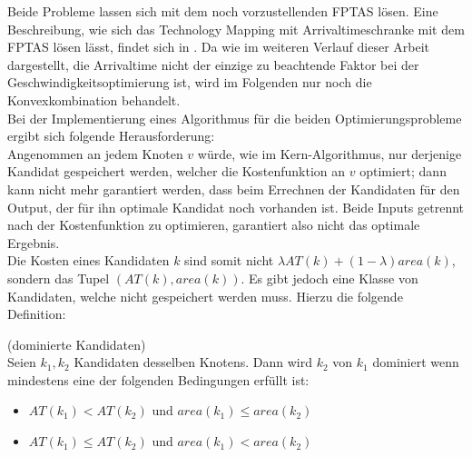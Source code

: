 \documentclass[11pt, a4paper, german]{article}
\newcommand{\TM}{Technology  Mapping }
\begin{document}
Beide Probleme lassen sich mit dem noch vorzustellenden FPTAS lösen. Eine Beschreibung, wie sich das \TM mit Arrivaltimeschranke mit dem FPTAS lösen lässt, findet sich in \cite{Elbert}.  Da wie im weiteren Verlauf dieser Arbeit dargestellt, die Arrivaltime nicht der einzige zu beachtende Faktor bei der Geschwindigkeitsoptimierung ist, wird im Folgenden nur noch die Konvexkombination behandelt.\\


Bei der Implementierung eines Algorithmus für die beiden Optimierungsprobleme ergibt sich folgende Herausforderung:\\

Angenommen an jedem Knoten $v$ würde, wie im Kern-Algorithmus, nur derjenige Kandidat gespeichert werden, welcher die Kostenfunktion an $v$ optimiert; dann kann nicht mehr garantiert werden, dass beim Errechnen der Kandidaten für den Output, der für ihn optimale Kandidat noch vorhanden ist. Beide Inputs getrennt nach der Kostenfunktion zu optimieren, garantiert also nicht das optimale Ergebnis.\\

Die Kosten eines Kandidaten $k$ sind somit nicht $\lambda AT(k) +(1-\lambda )area(k)$,  sondern das Tupel $(AT(k), area(k))$.
Es gibt jedoch eine Klasse von Kandidaten, welche nicht gespeichert werden muss. Hierzu die folgende Definition:

\begin{definition}{(dominierte Kandidaten)}\\
	Seien $k_1, k_2$ Kandidaten desselben Knotens. Dann wird $k_2$ von $k_1$ dominiert wenn mindestens eine der folgenden Bedingungen erfüllt ist:
	\begin{itemize}
	\item $AT(k_1) < AT(k_2) \text { und  }area(k_1) \leq area(k_2)$
	\item $	AT(k_1) \leq AT(k_2) \text{ und } area(k_1) < area(k_2)$	
	\end{itemize}
\end{definition}
\end{document}
